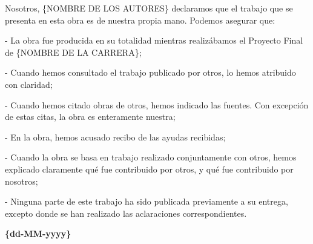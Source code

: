 \thispagestyle{empty}
\newpage
\vspace*{\fill}
        Nosotros, \{NOMBRE DE LOS AUTORES\} declaramos que el trabajo que se presenta en esta obra es de nuestra%
        propia mano. Podemos asegurar que:
        
        - La obra fue producida en su totalidad mientras realizábamos el Proyecto Final de \{NOMBRE DE LA CARRERA\};%
        
        - Cuando hemos consultado el trabajo publicado por otros, lo hemos atribuido con claridad;
        
        - Cuando hemos citado obras de otros, hemos indicado las fuentes. Con excepción de estas citas, la obra es enteramente nuestra;
        
        - En la obra, hemos acusado recibo de las ayudas recibidas;
        
        - Cuando la obra se basa en trabajo realizado conjuntamente con otros, hemos explicado claramente qué fue contribuido por otros, y qué fue contribuido por nosotros;
        
        - Ninguna parte de este trabajo ha sido publicada previamente a su entrega, excepto donde se han realizado las aclaraciones correspondientes.
\bigskip
\begin{center}

\end{center}


\vspace*{\fill}

\begin{center}
\textbf{\{dd-MM-yyyy\}}%
\end{center}
\newpage